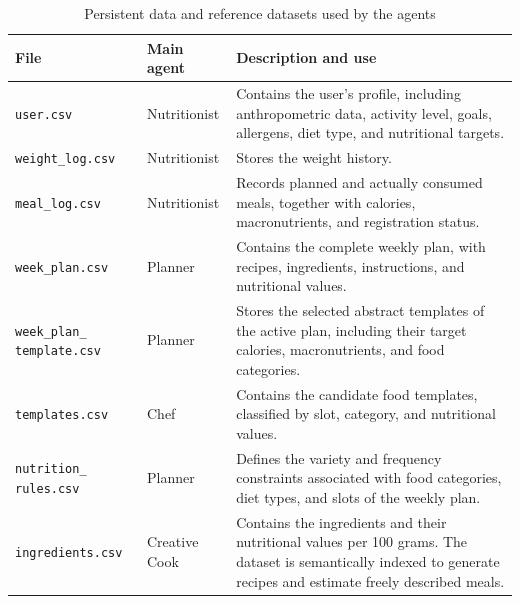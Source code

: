 \documentclass[12pt,a4paper]{article}
\newcommand{\toprule}{\hline}
\newcommand{\midrule}{\hline}
\newcommand{\bottomrule}{\hline}
\begin{document}
\begin{table}[H]
\centering
\small
\setlength{\tabcolsep}{5pt}
\renewcommand{\arraystretch}{1.15}

\begin{tabularx}{\textwidth}{
    @{}
    p{}
    p{}
    X
    @{}
}
\toprule
File & Main agent & Description and use \\
\midrule

\texttt{user.csv}
& Nutritionist
& Contains the user's profile, including anthropometric data, activity
level, goals, allergens, diet type, and nutritional
targets. \\

\texttt{weight\_log.csv}
& Nutritionist
& Stores the weight history. \\

\texttt{meal\_log.csv}
& Nutritionist
& Records planned and actually consumed meals, together with calories,
macronutrients, and registration status. \\

\texttt{week\_plan.csv}
& Planner
& Contains the complete weekly plan, with recipes, ingredients, instructions,
and nutritional values. \\

\texttt{week\_plan\_}\newline
\texttt{template.csv}
& Planner
& Stores the selected abstract templates of the active plan, including their
target calories, macronutrients, and food categories. \\

\texttt{templates.csv}
& Chef
& Contains the candidate food templates, classified by slot, category,
and nutritional values. \\

\texttt{nutrition\_}\newline
\texttt{rules.csv}
& Planner
& Defines the variety and frequency constraints associated with food
categories, diet types, and slots of the weekly plan. \\

\texttt{ingredients.csv}
& Creative Cook
& Contains the ingredients and their nutritional values per 100 grams.
The dataset is semantically indexed to generate recipes and estimate
freely described meals. \\

\bottomrule
\end{tabularx}

\caption{Persistent data and reference datasets used by the agents}
\end{table}
\end{document}
